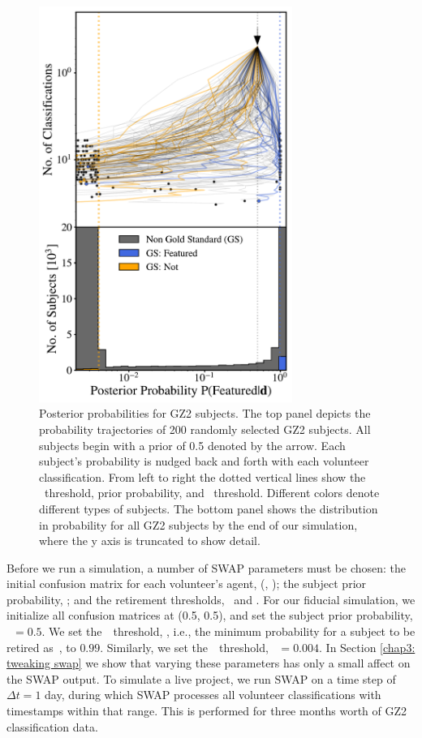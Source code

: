 \begin{figure} 
\centering
\includegraphics[width=3.25in]{Figures/human_machine/f3.pdf}
\caption[Galaxy posterior probabilities realized through SWAP reprocessing of GZ2 data.]{Posterior probabilities for GZ2 subjects.  The top panel depicts the probability trajectories of 200 randomly selected GZ2 subjects. All subjects begin with a prior of 0.5 denoted by the arrow. Each subject's probability is nudged back and forth with each volunteer classification. From left to right the dotted vertical lines show the \notfeat~threshold, prior probability, and \feat~threshold. Different colors denote different types of subjects. The bottom panel shows the distribution in probability for all GZ2 subjects by the end of our simulation, where the y axis is truncated to show detail.}
\label{fig: subject probabilities}
\end{figure}


Before we run a simulation, a number of SWAP parameters must be chosen: the initial confusion matrix for each volunteer's agent, (\Pf, \Pn); the subject prior probability, \p; and the retirement thresholds, \tf~and \tn. For our fiducial  simulation, we initialize all confusion matrices at (0.5, 0.5), and set the subject prior probability, \p~$= 0.5$. We set the~\feat~threshold, \tf, i.e., the minimum probability for a subject to be retired as~\feat, to $0.99$. Similarly, we set the~\notfeat~threshold, \tn~$= 0.004$. In Section \ref{chap3: tweaking swap} we show that varying these parameters has only a small affect on the SWAP output. To simulate a live project, we run SWAP on a time step of $\Delta t = 1$ day, during which SWAP processes all volunteer classifications with timestamps within that range. This is performed for three months worth of GZ2 classification data. 


